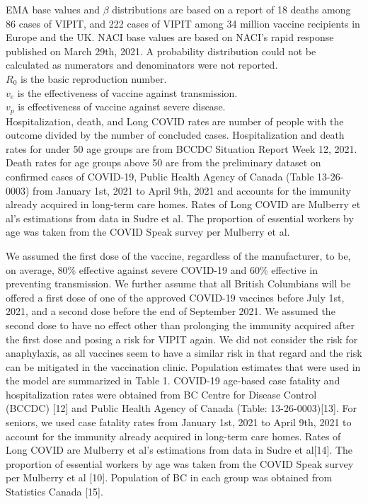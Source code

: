 \documentclass[]{elsarticle} %
\begin{document}
\begin{table}
{\begin{tabular}{llllll}
 \bottomrule 

\end{tabular}}
\begin{tablenotes}
\small
\item EMA base values and $\beta$ distributions are based on a report of 18 deaths among 86 cases of VIPIT, and 222 cases of VIPIT among 34 million vaccine recipients in Europe and the UK. NACI base values are based on NACI's rapid response published on March 29th, 2021. A probability distribution could not be calculated as numerators and denominators were not reported.\\
$R_0$ is the basic reproduction number.\\ $v_e$ is the effectiveness of vaccine against transmission.\\ $v_p$ is effectiveness of vaccine against severe disease.\\ Hospitalization, death, and Long COVID rates are number of people with the outcome divided by the number of concluded cases. Hospitalization and death rates for under 50 age groups are from BCCDC Situation Report Week 12, 2021. Death rates for age groups above 50 are from the preliminary dataset on confirmed cases of COVID-19, Public Health Agency of Canada (Table 13-26-0003) from January 1st, 2021 to April 9th, 2021 and accounts for the immunity already acquired in long-term care homes. Rates of Long COVID are Mulberry et al's estimations from data in Sudre et al. The proportion of essential workers by age was taken from the COVID Speak survey per Mulberry et al.\\
\end{tablenotes}

\label{harm-param}
\end{table}

We assumed the first dose of the vaccine, regardless of the
manufacturer, to be, on average, 80\% effective against severe COVID-19
and 60\% effective in preventing transmission. We further assume that
all British Columbians will be offered a first dose of one of the
approved COVID-19 vaccines before July 1st, 2021, and a second dose
before the end of September 2021. We assumed the second dose to have no
effect other than prolonging the immunity acquired after the first dose
and posing a risk for VIPIT again. We did not consider the risk for
anaphylaxis, as all vaccines seem to have a similar risk in that regard
and the risk can be mitigated in the vaccination clinic. Population
estimates that were used in the model are summarized in Table 1.
COVID-19 age-based case fatality and hospitalization rates were obtained
from BC Centre for Disease Control (BCCDC) {[}12{]} and Public Health
Agency of Canada (Table: 13-26-0003){[}13{]}. For seniors, we used case
fatality rates from January 1st, 2021 to April 9th, 2021 to account for
the immunity already acquired in long-term care homes. Rates of Long
COVID are Mulberry et al's estimations from data in Sudre et al{[}14{]}.
The proportion of essential workers by age was taken from the COVID
Speak survey per Mulberry et al {[}10{]}. Population of BC in each group
was obtained from Statistics Canada {[}15{]}.
\end{document}
